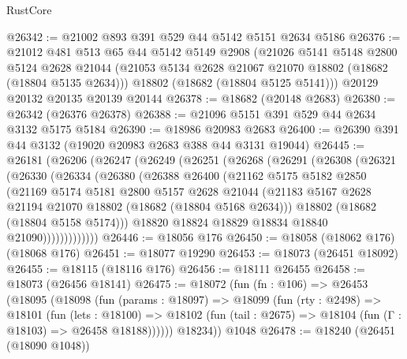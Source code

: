 \begin{lexlean}{RustCore}
\begin{coremodule}
@26342 := @21002 @893 @391 @529 @44 @5142 @5151 @2634 @5186
@26376 := @21012
    @481
    @513
    @65
    @44
    @5142
    @5149
    @2908
    (@21026
      @5141
      @5148
      @2800
      @5124
      @2628
      @21044
      (@21053 @5134 @2628 @21067 @21070 @18802 (@18682 (@18804 @5135 @2634)))
      @18802
      (@18682 (@18804 @5125 @5141)))
    @20129
    @20132
    @20135
    @20139
    @20144
@26378 := @18682 (@20148 @2683)
@26380 := @26342 (@26376 @26378)
@26388 := @21096 @5151 @391 @529 @44 @2634 @3132 @5175 @5184
@26390 := @18986 @20983 @2683
@26400 := @26390 @391 @44 @3132 (@19020 @20983 @2683 @388 @44 @3131 @19044)
@26445 := @26181
    (@26206
      (@26247
        (@26249
          (@26251
            (@26268
              (@26291
                (@26308
                  (@26321
                    (@26330
                      (@26334
                        (@26380
                          (@26388
                            @26400
                            (@21162
                              @5175
                              @5182
                              @2850
                              (@21169
                                @5174
                                @5181
                                @2800
                                @5157
                                @2628
                                @21044
                                (@21183
                                  @5167
                                  @2628
                                  @21194
                                  @21070
                                  @18802
                                  (@18682 (@18804 @5168 @2634)))
                                @18802
                                (@18682 (@18804 @5158 @5174)))
                              @18820
                              @18824
                              @18829
                              @18834
                              @18840
                              @21090)))))))))))))
@26446 := @18056 @176
@26450 := @18058 (@18062 @176) (@18068 @176)
@26451 := @18077 @19290
@26453 := @18073 (@26451 @18092)
@26455 := @18115 (@18116 @176)
@26456 := @18111 @26455
@26458 := @18073 (@26456 @18141)
@26475 := @18072
    (fun (fn : @106) =>
    @26453
      (@18095
        (@18098
          (fun (params : @18097) =>
          @18099
            (fun (rty : @2498) =>
            @18101
              (fun (lets : @18100) =>
              @18102 (fun (tail : @2675) => @18104 (fun (Γ : @18103) => @26458 @18188))))))
        @18234))
    @1048
@26478 := @18240 (@26451 (@18090 @1048))

\end{coremodule}
\end{lexlean}
